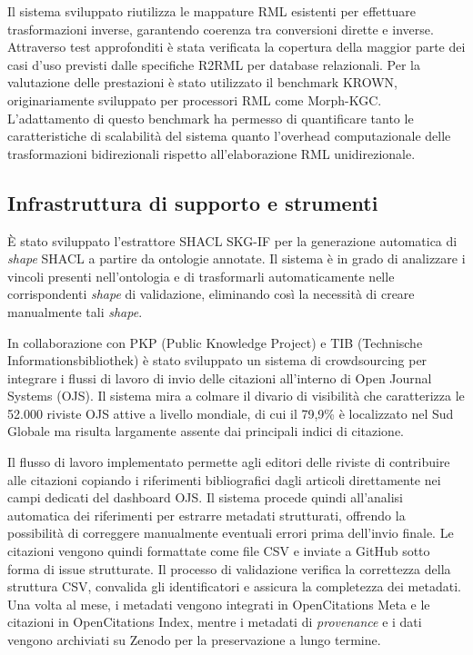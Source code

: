 \documentclass[11pt,a4paper]{article}
\begin{document}
Il sistema sviluppato riutilizza le mappature RML esistenti per effettuare trasformazioni inverse, garantendo coerenza tra conversioni dirette e inverse. Attraverso test approfonditi è stata verificata la copertura della maggior parte dei casi d'uso previsti dalle specifiche R2RML per database relazionali. Per la valutazione delle prestazioni è stato utilizzato il benchmark KROWN, originariamente sviluppato per processori RML come Morph-KGC. L'adattamento di questo benchmark ha permesso di quantificare tanto le caratteristiche di scalabilità del sistema quanto l'overhead computazionale delle trasformazioni bidirezionali rispetto all'elaborazione RML unidirezionale.

\subsection{Infrastruttura di supporto e strumenti}

È stato sviluppato l'estrattore SHACL SKG-IF per la generazione automatica di \textit{shape} SHACL a partire da ontologie annotate. Il sistema è in grado di analizzare i vincoli presenti nell'ontologia e di trasformarli automaticamente nelle corrispondenti \textit{shape} di validazione, eliminando così la necessità di creare manualmente tali \textit{shape}.

In collaborazione con PKP (Public Knowledge Project) e TIB (Technische Informationsbibliothek) è stato sviluppato un sistema di crowdsourcing per integrare i flussi di lavoro di invio delle citazioni all'interno di Open Journal Systems (OJS). Il sistema mira a colmare il divario di visibilità che caratterizza le 52.000 riviste OJS attive a livello mondiale, di cui il 79,9\% è localizzato nel Sud Globale ma risulta largamente assente dai principali indici di citazione.

Il flusso di lavoro implementato permette agli editori delle riviste di contribuire alle citazioni copiando i riferimenti bibliografici dagli articoli direttamente nei campi dedicati del dashboard OJS. Il sistema procede quindi all'analisi automatica dei riferimenti per estrarre metadati strutturati, offrendo la possibilità di correggere manualmente eventuali errori prima dell'invio finale. Le citazioni vengono quindi formattate come file CSV e inviate a GitHub sotto forma di issue strutturate. Il processo di validazione verifica la correttezza della struttura CSV, convalida gli identificatori e assicura la completezza dei metadati. Una volta al mese, i metadati vengono integrati in OpenCitations Meta e le citazioni in OpenCitations Index, mentre i metadati di \textit{provenance} e i dati vengono archiviati su Zenodo per la preservazione a lungo termine.
\end{document}

